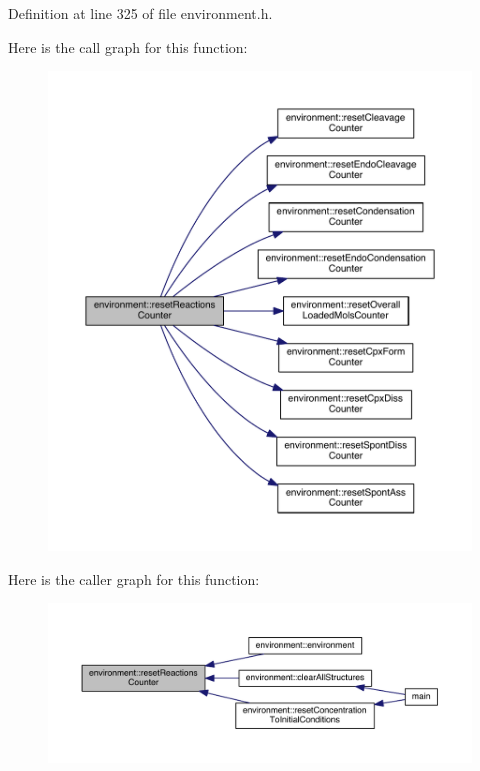 Definition at line 325 of file environment.\-h.



Here is the call graph for this function\-:
\nopagebreak
\begin{figure}[H]
\begin{center}
\leavevmode
\includegraphics[width=350pt]{a00014_a5c8713237992b28c39199a7aea3f9ea0_cgraph}
\end{center}
\end{figure}




Here is the caller graph for this function\-:
\nopagebreak
\begin{figure}[H]
\begin{center}
\leavevmode
\includegraphics[width=350pt]{a00014_a5c8713237992b28c39199a7aea3f9ea0_icgraph}
\end{center}
\end{figure}


